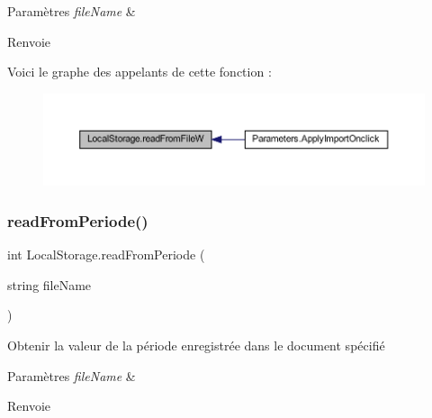 \begin{DoxyParams}{Paramètres}
{\em file\+Name} & \\
\hline
\end{DoxyParams}
\begin{DoxyReturn}{Renvoie}

\end{DoxyReturn}
Voici le graphe des appelants de cette fonction \+:
\nopagebreak
\begin{figure}[H]
\begin{center}
\leavevmode
\includegraphics[width=350pt]{class_local_storage_aef684ee38f8d4dccf157503ec6d04a7a_icgraph}
\end{center}
\end{figure}
\mbox{\label{class_local_storage_a8e862054e8b3f3c33dd64ed44d5983c4}} 
\subsubsection{\texorpdfstring{read\+From\+Periode()}{readFromPeriode()}}
{\footnotesize\ttfamily int Local\+Storage.\+read\+From\+Periode (\begin{DoxyParamCaption}\item[{string}]{file\+Name }\end{DoxyParamCaption})\hspace{0.3cm}{\ttfamily [inline]}}



Obtenir la valeur de la période enregistrée dans le document spécifié 


\begin{DoxyParams}{Paramètres}
{\em file\+Name} & \\
\hline
\end{DoxyParams}
\begin{DoxyReturn}{Renvoie}

\end{DoxyReturn}
\mbox{\label{class_local_storage_afbd7328c28fa47b11fcc174da3cc8ec1}} 
